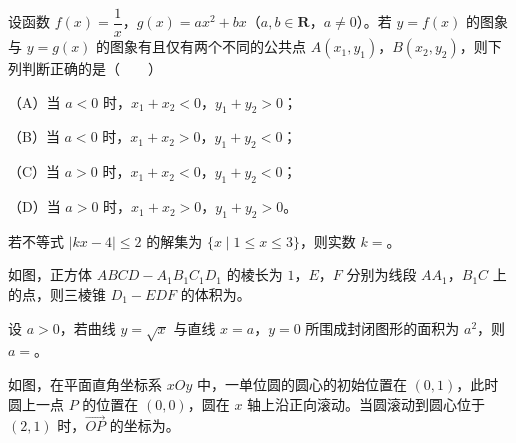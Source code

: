\begin{question}
设函数 $f(x)=\dfrac1x$，$g(x)=ax^2+bx$（$a,b\in\mathbf R$，$a\neq0$）。若 $y=f(x)$ 的图象与 $y=g(x)$ 的图象有且仅有两个不同的公共点 $A(x_1,y_1)$，$B(x_2,y_2)$，则下列判断正确的是\mbox{（　　）}

（A）当 $a<0$ 时，$x_1+x_2<0$，$y_1+y_2>0$；

（B）当 $a<0$ 时，$x_1+x_2>0$，$y_1+y_2<0$；

（C）当 $a>0$ 时，$x_1+x_2<0$，$y_1+y_2<0$；

（D）当 $a>0$ 时，$x_1+x_2>0$，$y_1+y_2>0$。

\end{question}

\begin{question}
若不等式 $|kx-4|\leqslant2$ 的解集为 $\{x\mid1\leqslant x\leqslant3\}$，则实数 $k=$\gkblank{}。

\Needspace{0.4\textheight}
\end{question}
\begin{question}
如图，正方体 $ABCD-A_1B_1C_1D_1$ 的棱长为 $1$，$E$，$F$ 分别为线段 $AA_1$，$B_1C$ 上的点，则三棱锥 $D_1-EDF$ 的体积为\gkblank{}。
\nopagebreak[4]
\begin{center}\end{center}
\nopagebreak[4]
\end{question}
\begin{question}
设 $a>0$，若曲线 $y=\sqrt x$ 与直线 $x=a$，$y=0$ 所围成封闭图形的面积为 $a^2$，则 $a=$\gkblank{}。

\Needspace{0.4\textheight}
\end{question}
\begin{question}
如图，在平面直角坐标系 $xOy$ 中，一单位圆的圆心的初始位置在 $(0,1)$，此时圆上一点 $P$ 的位置在 $(0,0)$，圆在 $x$ 轴上沿正向滚动。当圆滚动到圆心位于 $(2,1)$ 时，$\overrightarrow{OP}$ 的坐标为\gkblank{}。
\nopagebreak[4]
\begin{center}\end{center}
\nopagebreak[4]
\end{question}

